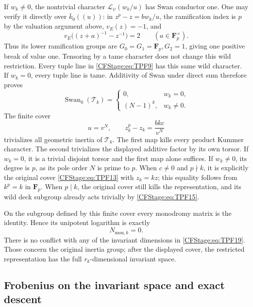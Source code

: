 If \(w_k\ne0\), the nontrivial character
\(\mathcal L_\psi(w_k/u)\) has Swan conductor one.
One may verify it directly over \(\bar k_0((u))\):
in \(z^p-z=bw_k/u\), the ramification index is \(p\)
by the valuation argument above, \(v_E(z)=-1\), and
\[
 v_E\bigl((z+a)^{-1}-z^{-1}\bigr)=2
                         \qquad(a\in\mathbf F_p^\times).
 \tag{TPF.21}\label{CFStage:eq:TPF21}
\]
Thus its lower ramification groups are
\(G_0=G_1=\mathbf F_p,G_2=1\), giving one positive
break of value one. Tensoring by a tame character
does not change this wild restriction. Every tuple
line in \eqref{CFStage:eq:TPF9} has this same wild character.
If \(w_k=0\), every tuple line is tame. Additivity of
Swan under direct sum therefore proves
\[
 \boxed{\displaystyle
 \operatorname{Swan}_0(\mathcal T_k)=
 \begin{cases}
 0,&w_k=0,\\
 (N-1)^k,&w_k\ne0 .
 \end{cases}}
 \tag{TPF.22}\label{CFStage:eq:TPF22}
\]
The finite cover
\[
 u=v^N,\qquad z_k^p-z_k=\frac{bkc}{v^N}
 \tag{TPF.23}\label{CFStage:eq:TPF23}
\]
trivializes all geometric inertia of \(\mathcal T_k\).
The first map kills every product Kummer character.
The second trivializes the displayed additive factor
by its own torsor. If \(w_k=0\), it is a trivial
disjoint torsor and the first map alone suffices.
If \(w_k\ne0\), its degree is \(p\), as its pole order
\(N\) is prime to \(p\). When \(c\ne0\) and
\(p\nmid k\), it is explicitly the original cover
\eqref{CFStage:eq:TPF13} with \(z_k=kz\); this equality follows
from \(k^p=k\) in \(\mathbf F_p\).
When \(p\mid k\), the original cover still kills the
representation, and its wild deck subgroup already
acts trivially by \eqref{CFStage:eq:TPF15}.

On the subgroup defined by this finite cover every
monodromy matrix is the identity. Hence its unipotent
logarithm is exactly
\[
 N_{\mathrm{mon},k}=0 .
 \tag{TPF.24}\label{CFStage:eq:TPF24}
\]
There is no conflict with any of the invariant
dimensions in \eqref{CFStage:eq:TPF19}. Those concern the
original inertia group; after the displayed cover,
the restricted representation has the full
\(r_k\)-dimensional invariant space.

\subsection{Frobenius on the invariant space and exact descent}

